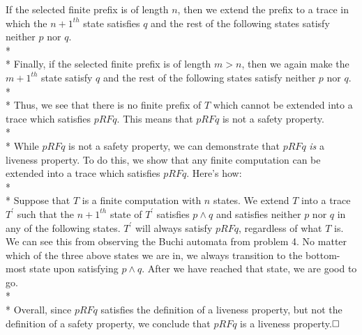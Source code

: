 \documentclass[12pt]{article}
\begin{document}
If the selected finite prefix is of length $n$, then we extend the prefix to a trace in which the $n+1^{th}$ state satisfies $q$ and the rest of the following states satisfy neither $p$ nor $q$.\\*\\*
Finally, if the selected finite prefix is of length $m>n$, then we again make the $m+1^{th}$ state satisfy $q$ and the rest of the following states satisfy neither $p$ nor $q$.\\*\\*
Thus, we see that there is no finite prefix of $T$ which cannot be extended into a trace which satisfies $pRFq$. This means that $pRFq$ is not a safety property.\\*\\*
While $pRFq$ is not a safety property, we can demonstrate that $pRFq$ \textit{is} a liveness property. To do this, we show that any finite computation can be extended into a trace which satisfies $pRFq$. Here's how:\\*\\*
Suppose that $T$ is a finite computation with $n$ states. We extend $T$ into a trace $T^\prime$ such that the $n+1^{th}$ state of $T^\prime$ satisfies $p\wedge q$ and satisfies neither $p$ nor $q$ in any of the following states. $T^\prime$ will always satisfy $pRFq$, regardless of what $T$ is. We can see this from observing the Buchi automata from problem 4. No matter which of the three above states we are in, we always transition to the bottom-most state upon satisfying $p\wedge q$. After we have reached that state, we are good to go.\\*\\*
Overall, since $pRFq$ satisfies the definition of a liveness property, but not the definition of a safety property, we conclude that $pRFq$ is a liveness property.$\hfill\Box$
\end{document}
